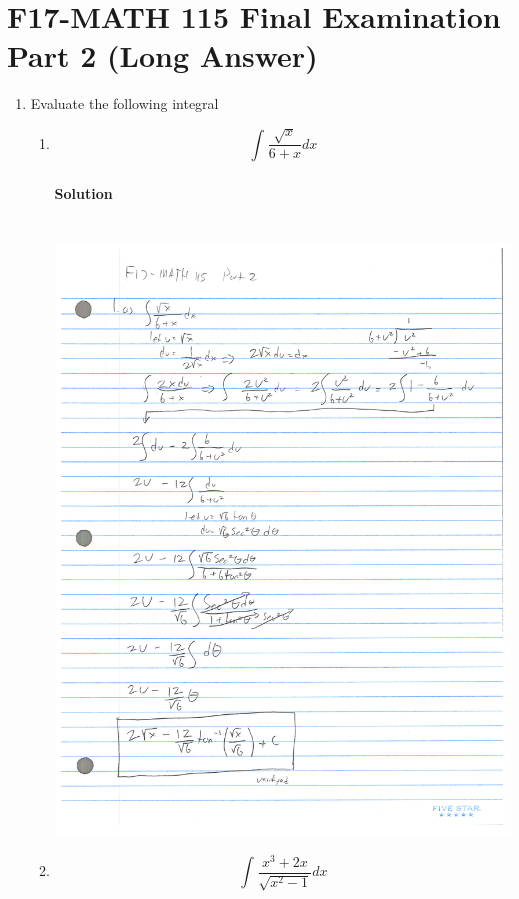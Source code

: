 \documentclass[MATH-115-Notes.tex]{subfiles}
\begin{document}
\section{F17-MATH 115 Final Examination Part 2 (Long Answer)}
\begin{enumerate}
    \item Evaluate the following integral
    \begin{enumerate}
        \item \[\int_{}^{}\frac{\sqrt{x}}{6+x}dx\]
        \paragraph{Solution}~\\
        {\centering\includegraphics[trim={0 0 0 0},clip,scale=0.45]{./figures/math-final-work001.jpg}\\}
        \newpage
        \item \[\int_{}^{}\frac{x^3 + 2x}{\sqrt{x^2 - 1}}dx\]

\end{enumerate}
\end{enumerate}
\end{document}
